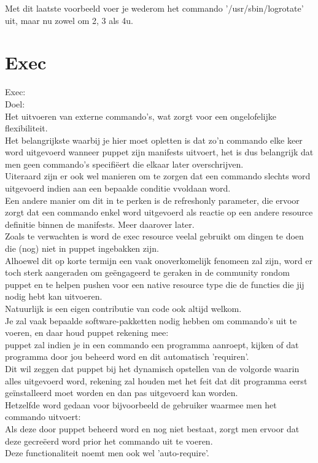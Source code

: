 	Met dit laatste voorbeeld voer je wederom het commando '/usr/sbin/logrotate' uit, maar nu zowel om 2, 3 als 4u.\\

\section{Exec}
Exec:\\
Doel:\\
	Het uitvoeren van externe commando's, wat zorgt voor een ongelofelijke flexibiliteit.\\
	Het belangrijkste waarbij je hier moet opletten is dat zo'n commando elke keer word uitgevoerd wanneer puppet zijn manifests uitvoert, het is dus belangrijk dat men geen commando's specifi\"{e}ert die elkaar later overschrijven.\\
	Uiteraard zijn er ook wel manieren om te zorgen dat een commando slechts word uitgevoerd indien aan een bepaalde conditie vvoldaan word.\\
	Een andere manier om dit in te perken is de refreshonly parameter, die ervoor zorgt dat een commando enkel word uitgevoerd als reactie op een andere resource definitie binnen de manifests. Meer daarover later.\\

	Zoals te verwachten is word de exec resource veelal gebruikt om dingen te doen die (nog) niet in puppet ingebakken zijn.\\
	Alhoewel dit op korte termijn een vaak onoverkomelijk fenomeen zal zijn, word er toch sterk aangeraden om ge\"{e}ngageerd te geraken in de community rondom puppet en te helpen pushen voor een native resource type die de functies die jij nodig hebt kan uitvoeren.\\
	Natuurlijk is een eigen contributie van code ook altijd welkom.\\

	Je zal vaak bepaalde software-pakketten nodig hebben om commando's uit te voeren, en daar houd puppet rekening mee:\\
	puppet zal indien je in een commando een programma aanroept, kijken of dat programma door jou beheerd word en dit automatisch 'requiren'.\\
	Dit wil zeggen dat puppet bij het dynamisch opstellen van de volgorde waarin alles uitgevoerd word, rekening zal houden met het feit dat dit programma eerst geïnstalleerd moet worden en dan pas uitgevoerd kan worden.\\
	Hetzelfde word gedaan voor bijvoorbeeld de gebruiker waarmee men het commando uitvoert:\\
	Als deze door puppet beheerd word en nog niet bestaat, zorgt men ervoor dat deze gecre\"{e}erd word prior het commando uit te voeren.\\
	Deze functionaliteit noemt men ook wel 'auto-require'.\\

